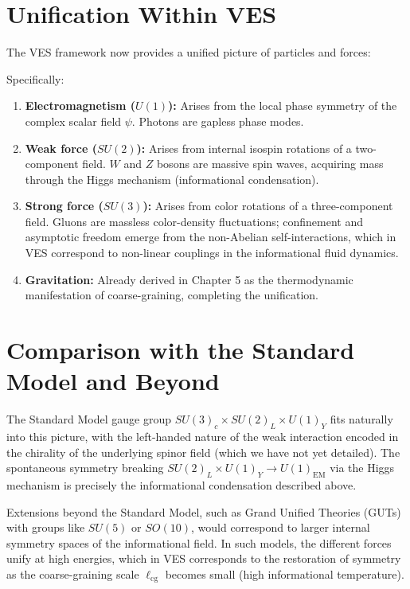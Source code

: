 \documentclass[12pt,a4paper]{book}
\begin{document}
\section{Unification Within VES}

The VES framework now provides a unified picture of particles and forces:
\begin{center}
\end{center}
Specifically:
\begin{enumerate}
    \item \textbf{Electromagnetism ($U(1)$):} Arises from the local phase symmetry of the complex scalar field $\psi$. Photons are gapless phase modes.
    \item \textbf{Weak force ($SU(2)$):} Arises from internal isospin rotations of a two-component field. $W$ and $Z$ bosons are massive spin waves, acquiring mass through the Higgs mechanism (informational condensation).
    \item \textbf{Strong force ($SU(3)$):} Arises from color rotations of a three-component field. Gluons are massless color-density fluctuations; confinement and asymptotic freedom emerge from the non-Abelian self-interactions, which in VES correspond to non-linear couplings in the informational fluid dynamics.
    \item \textbf{Gravitation:} Already derived in Chapter 5 as the thermodynamic manifestation of coarse-graining, completing the unification.
\end{enumerate}

\section{Comparison with the Standard Model and Beyond}

The Standard Model gauge group $SU(3)_c \times SU(2)_L \times U(1)_Y$ fits naturally into this picture, with the left-handed nature of the weak interaction encoded in the chirality of the underlying spinor field (which we have not yet detailed). The spontaneous symmetry breaking $SU(2)_L \times U(1)_Y \rightarrow U(1)_{\text{EM}}$ via the Higgs mechanism is precisely the informational condensation described above.

Extensions beyond the Standard Model, such as Grand Unified Theories (GUTs) with groups like $SU(5)$ or $SO(10)$, would correspond to larger internal symmetry spaces of the informational field. In such models, the different forces unify at high energies, which in VES corresponds to the restoration of symmetry as the coarse-graining scale $\ell_{\text{cg}}$ becomes small (high informational temperature).
\end{document}
